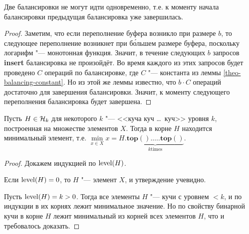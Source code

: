 \begin{lem} \label{theo-single-bal}
Две балансировки не могут идти одновременно, т.е.
к моменту начала балансировки предыдущая балансировка уже завершилась.
\end{lem}
\begin{proof}
Заметим, что если переполнение буфера возникло при размере $b$, то следующее
переполнение возникнет при б\'ольшем размере буфера, поскольку логарифм "---
монотонная функция. Значит, в течение следующих $b$ запросов \textbf{insert}
балансировка не произойдёт. Во время каждого из этих запросов будет проведено
$C$ операций по балансировке, где $C$ "--- константа из леммы \ref{theo-balancing-constant}.
Но из этой же леммы известно, что $b \cdot C$ операций достаточно для завершения
балансировки. Значит, к моменту следующего переполнения балансировка будет завершена.
\end{proof}

\begin{lem} \label{theo-hk-top-is-min}
Пусть $H \in \mathcal{H}_k$ для некоторого $k$ "--- <<куча куч \dots\ куч>> уровня $k$,
построенная на множестве элементов $X$. Тогда в корне $H$ находится минимальный элемент,
т.е. $\min\limits_{x\in X} x = H.\underbrace{\mathbf{top}().\dots.\mathbf{top}()}_{k \mathrm{ times}}$.
\end{lem}
\begin{proof}
Докажем индукцией по $\operatorname{level}(H)$.

Если $\operatorname{level}(H) = 0$, то $H$ "--- элемент $X$, и утверждение учевидно.

Пусть $\operatorname{level}(H) = k > 0$. Тогда все элементы $H$ "--- кучи с уровнем $<k$,
и по индукции в их корнях лежит минимальное значение. Но по свойству
бинарной кучи в корне $H$ лежит минимальный из корней всех
элементов $H$, что и требовалось доказать.
\end{proof}


